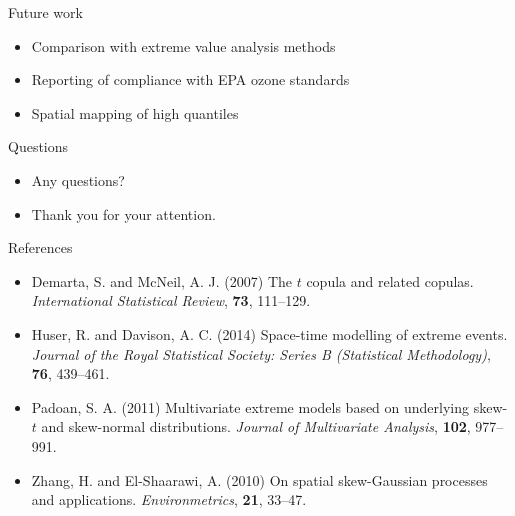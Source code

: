 \documentclass{beamer}
\begin{document}
\begin{frame}{Future work}
  \begin{itemize} \setlength{\itemsep}{0.5em}
    \item Comparison with extreme value analysis methods
    \item Reporting of compliance with EPA ozone standards
    \item Spatial mapping of high quantiles
  \end{itemize}
\end{frame}

\begin{frame}{Questions}
  \begin{itemize} \setlength{\itemsep}{0.5em}
    \item Any questions?
    \item Thank you for your attention.
  \end{itemize}
\end{frame}

\begin{frame}{References}
  \begin{itemize} \setlength{\itemsep}{0.5em}
    \item Demarta, S. and McNeil, A. J. (2007) The $t$ copula and related copulas. {\it International Statistical Review}, {\bf 73}, 111--129.
    \item Huser, R. and Davison, A. C. (2014) Space-time modelling of extreme events. {\it Journal of the Royal Statistical Society: Series B (Statistical Methodology)}, {\bf 76}, 439--461.
    \item Padoan, S. A. (2011) Multivariate extreme models based on underlying skew-$t$ and skew-normal distributions. {\it Journal of Multivariate Analysis}, {\bf 102}, 977--991.
    \item Zhang, H. and El-Shaarawi, A. (2010) On spatial skew-Gaussian processes and applications. {\it Environmetrics}, {\bf 21}, 33--47.
  \end{itemize}
\end{frame}
\end{document}
